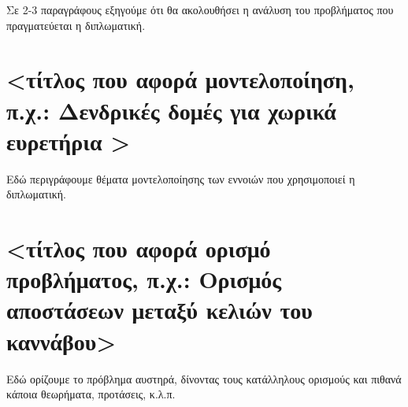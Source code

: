 Σε 2-3 παραγράφους εξηγούμε ότι θα ακολουθήσει η ανάλυση του προβλήματος που πραγματεύεται η διπλωματική.

\section{<τίτλος που αφορά μοντελοποίηση, π.χ.: Δενδρικές δομές για χωρικά ευρετήρια >}

Εδώ περιγράφουμε θέματα μοντελοποίησης των εννοιών που χρησιμοποιεί η διπλωματική.

\section{<τίτλος που αφορά ορισμό προβλήματος, π.χ.: Ορισμός αποστάσεων μεταξύ κελιών του καννάβου>}

Εδώ ορίζουμε το πρόβλημα αυστηρά, δίνοντας τους κατάλληλους ορισμούς και πιθανά κάποια θεωρήματα, προτάσεις, κ.λ.π. 



